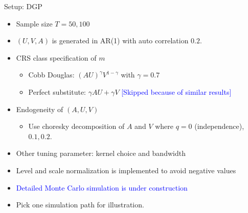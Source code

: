 \documentclass[aspectratio=169]{beamer}
\begin{document}
\begin{frame}{Setup: DGP}
\begin{itemize}
    \item Sample size $T=50,100$
    \item $(U,V,A)$ is generated in AR(1) with auto correlation $0.2$.
    \item CRS class specification of $m$
    \begin{itemize}
        \item Cobb Douglas: $(AU)^{\gamma}V^{1-\gamma}$ with $\gamma=0.7$
        \item Perfect substitute: $\gamma AU+\gamma V$ \textcolor{blue}{[Skipped because of similar results]}
    \end{itemize}
    \item Endogeneity of $(A,U,V)$
    \begin{itemize}
        \item Use choresky decomposition of $A$ and $V$ where $q=0$ (independence), $0.1, 0.2$.
    \end{itemize}
    \item Other tuning parameter: kernel choice and bandwidth 
    \item Level and scale normalization is implemented to avoid negative values
    \item \textcolor{blue}{Detailed Monte Carlo simulation is under construction}
    \item Pick one simulation path for illustration.
\end{itemize}
    
\end{frame}
\end{document}
